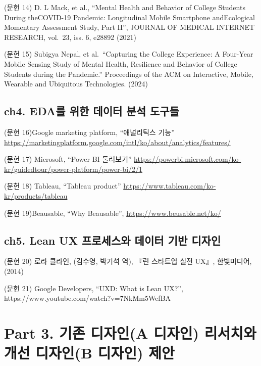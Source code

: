 \documentclass[
  letterpaper,
]{book}
\begin{document}
(문헌 14) D. L Mack, et al., ``Mental Health and Behavior of College
Students During theCOVID-19 Pandemic: Longitudinal Mobile Smartphone
andEcological Momentary Assessment Study, Part II'', JOURNAL OF MEDICAL
INTERNET RESEARCH, vol.~23, iss. 6, e28892 (2021)

(문헌 15) Subigya Nepal, et al.~``Capturing the College Experience: A
Four-Year Mobile Sensing Study of Mental Health, Resilience and Behavior
of College Students during the Pandemic.'' Proceedings of the ACM on
Interactive, Mobile, Wearable and Ubiquitous Technologies. (2024)

\section*{ch4. EDA를 위한 데이터 분석
도구들}\label{ch4.-edauxb97c-uxc704uxd55c-uxb370uxc774uxd130-uxbd84uxc11d-uxb3c4uxad6cuxb4e4-1}


(문헌 16)Google marketing platform, ``애널리틱스 기능''
\url{https://marketingplatform.google.com/intl/ko/about/analytics/features/}

(문헌 17) Microsoft, ``Power BI 둘러보기''
\url{https://powerbi.microsoft.com/ko-kr/guidedtour/power-platform/power-bi/2/1}

(문헌 18) Tableau, ``Tableau product''
\url{https://www.tableau.com/ko-kr/products/tableau}

(문헌 19)Beausable, ``Why Beausable'',
\url{https://www.beusable.net/ko/}

\section*{ch5. Lean UX 프로세스와 데이터 기반
디자인}\label{ch5.-lean-ux-uxd504uxb85cuxc138uxc2a4uxc640-uxb370uxc774uxd130-uxae30uxbc18-uxb514uxc790uxc778-1}


(문헌 20) 로라 클라인, (김수영, 박기석 역), 『린 스타트업 실전 UX』,
한빛미디어,(2014)

(문헌 21) Google Developers, ``UXD: What is Lean UX?'',
https://www.youtube.com/watch?v=7NkMm5WefBA


\chapter*{Part 3. 기존 디자인(A 디자인) 리서치와 개선 디자인(B 디자인)
제안}\label{part-3.-uxae30uxc874-uxb514uxc790uxc778a-uxb514uxc790uxc778-uxb9acuxc11cuxce58uxc640-uxac1cuxc120-uxb514uxc790uxc778b-uxb514uxc790uxc778-uxc81cuxc548-1}
\end{document}
